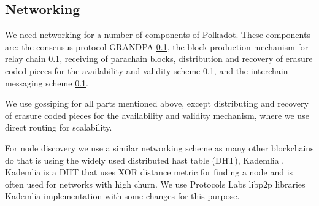 \subsection{Networking}

We need networking for a number of components of Polkadot.
These components are: the consensus protocol GRANDPA \ref{},
the block production mechanism for relay chain \ref{},
receiving of parachain blocks,
distribution and recovery of erasure coded pieces for the availability and validity scheme \ref{}, and
the interchain messaging scheme \ref{}.

We use gossiping for all parts mentioned above, except distributing and recovery of erasure coded pieces for the availability and validity mechanism, where we use direct routing for scalability.

For node discovery we use a similar networking scheme as many other blockchains do that is using the widely used distributed hast table (DHT), Kademlia \cite{}.
Kademlia is a DHT that uses XOR distance metric for finding a node and is often used for networks with high churn.
We use Protocols Labs libp2p libraries \cite{} Kademlia implementation with some changes for this purpose.
